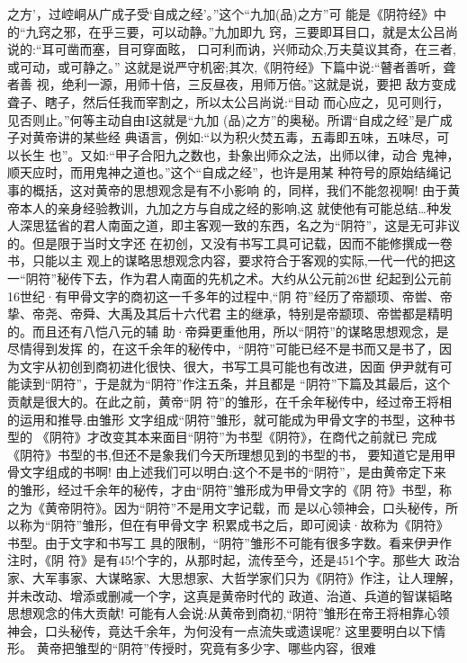 \documentclass[12pt,UTF8]{ctexbook}
\begin{document}
之方’，过崆峒从广成子受‘自成之经’。”这个“九加(品)之方”可
能是《阴符经》中的“九窍之邪，在乎三要，可以动静。”九加即九
窍，三要即耳目口，就是太公吕尚说的:“耳可凿而塞，目可穿面眩，
口可利而讷，兴师动众,万夫莫议其奇，在三者,或可动，或可静之。”
这就是说严守机密;其次,《阴符经》下篇中说:“瞽者善听，聋者善
视，绝利一源，用师十倍，三反昼夜，用师万倍。”这就是说，要把
敌方变成聋子、瞎子，然后任我而宰割之，所以太公吕尚说:“目动
而心应之，见可则行，见否则止。”何等主动自由I这就是“九加
(品)之方”的奥秘。所谓“自成之经”是广成子对黄帝讲的某些经
典语言，例如:“以为积火焚五毒，五毒即五味，五味尽，可以长生
也”。又如:“甲子合阳九之数也，卦象出师众之法，出师以律，动合
鬼神，顺天应时，而用鬼神之道也。”这个“自成之经”，也许是用某
种符号的原始结绳记事的概括，这对黄帝的思想观念是有不小影响
的，同样，我们不能忽视啊!
由于黄帝本人的亲身经验教训，九加之方与自成之经的影响,这
就使他有可能总结…种发人深思猛省的君人南面之道，即主客观一致的东西，名之为“阴符”，这是无可非议的。但是限于当时文字还
在初创，又没有书写工具可记载，因而不能修撰成一卷书，只能以主
观上的谋略思想观念内容，要求符合于客观的实际,一代一代的把这
一“阴符”秘传下去，作为君人南面的先机之术。大约从公元前26世
纪起到公元前16世纪·有甲骨文字的商初这一千多年的过程中,“阴
符”经历了帝颛顼、帝喾、帝挚、帝尧、帝舜、大禹及其后十六代君
主的继承，特别是帝颛顼、帝喾都是精明的。而且还有八恺八元的辅
助·帝舜更重他用，所以“阴符”的谋略思想观念，是尽情得到发挥
的，在这千余年的秘传中，“阴符”可能已经不是书而又是书了，因
为文宇从初创到商初进化很快、很大，书写工具可能也有改进，因面
伊尹就有可能读到“阴符”，于是就为“阴符”作注五条，并且都是
“阴符”下篇及其最后，这个贡献是很大的。在此之前，黄帝“阴
符”的雏形，在千余年秘传中，经过帝王将相的运用和推导.由雏形
文字组成“阴符”雏形，就可能成为甲骨文字的书型，这种书型的
《阴符》才改变其本来面目“阴符”为书型《阴符》，在商代之前就已
完成《阴符》书型的书,但还不是象我们今天所理想见到的书型的书，
要知道它是用甲骨文字组成的书啊!
由上述我们可以明白:这个不是书的“阴符”，是由黄帝定下来
的雏形，经过千余年的秘传，才由“阴符”雏形成为甲骨文字的《阴
符》书型，称之为《黄帝阴符》。因为“阴符”不是用文字记载，而
是以心领神会，口头秘传，所以称为“阴符”雏形，但在有甲骨文字
积累成书之后，即可阅读·故称为《阴符》书型。由于文字和书写工
具的限制，“阴符”雏形不可能有很多字数。看来伊尹作注时，《阴
符》是有45!个字的，从那时起，流传至今，还是451个字。那些大
政治家、大军事家、大谋略家、大思想家、大哲学家们只为《阴符》作注，让人理解，并未改动、增添或删减一个字，这真是黄帝时代的
政道、治道、兵道的智谋韬略思想观念的伟大贡献!
可能有人会说:从黄帝到商初,“阴符”雏形在帝王将相靠心领
神会，口头秘传，竟达千余年，为何没有一点流失或遗误呢?
这里要明白以下情形。
黄帝把雏型的“阴符”传授时，究竟有多少字、哪些内容，很难
\end{document}
